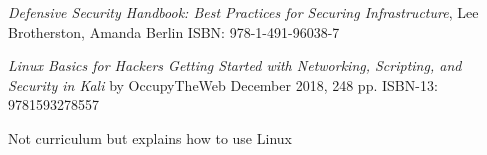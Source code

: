 \documentclass[Screen16to9,17pt]{foils}
\begin{document}


\emph{Defensive Security Handbook: Best Practices for Securing Infrastructure}, Lee Brotherston, Amanda Berlin ISBN: 978-1-491-96038-7




\emph{Linux Basics for Hackers
Getting Started with Networking, Scripting, and Security in Kali}
by OccupyTheWeb
December 2018, 248 pp.
ISBN-13:
9781593278557

Not curriculum but explains how to use Linux
\end{document}
